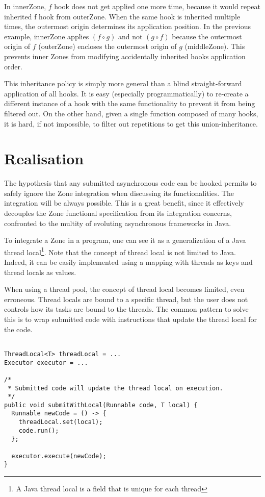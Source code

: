 In innerZone, $f$ hook does not get applied one more time, because it would repeat inherited f hook from outerZone. When the same hook is inherited multiple times, the outermost origin determines its application position. In the previous example, innerZone applies $( f \circ g )$ and not $( g \circ f )$ because the outermost origin of $f$ (outerZone) encloses the outermost origin of $g$ (middleZone). This prevents inner Zones from modifying accidentally inherited hooks application order.

This inheritance policy is simply more general than a blind straight-forward application of all hooks. It is easy (especially programmatically) to re-create a different instance of a hook with the same functionality to prevent it from being filtered out. On the other hand, given a single function composed of many hooks, it is hard, if not impossible, to filter out repetitions to get this union-inheritance.

\section{Realisation}

The hypothesis that any submitted asynchronous code can be hooked permits to safely ignore the Zone integration when discussing its functionalities. The integration will be always possible. This is a great benefit, since it effectively decouples the Zone functional specification from its integration concerns, confronted to the multity of evoluting asynchronous frameworks in Java.

To integrate a Zone in a program, one can see it as a generalization of a Java thread local\footnote{A Java thread local is a field that is unique for each thread}. Note that the concept of thread local is not limited to Java. Indeed, it can be easily implemented using a mapping with threads as keys and thread locals as values.

When using a thread pool, the concept of thread local becomes limited, even erroneous. Thread locals are bound to a specific thread, but the user does not controls how its tasks are bound to the threads. The common pattern to solve this is to wrap submitted code with instructions that update the thread local for the code.
\begin{lstlisting}

ThreadLocal<T> threadLocal = ...
Executor executor = ...

/*
 * Submitted code will update the thread local on execution.
 */
public void submitWithLocal(Runnable code, T local) {
  Runnable newCode = () -> {
    threadLocal.set(local);
    code.run();
  };

  executor.execute(newCode);
}
\end{lstlisting}

